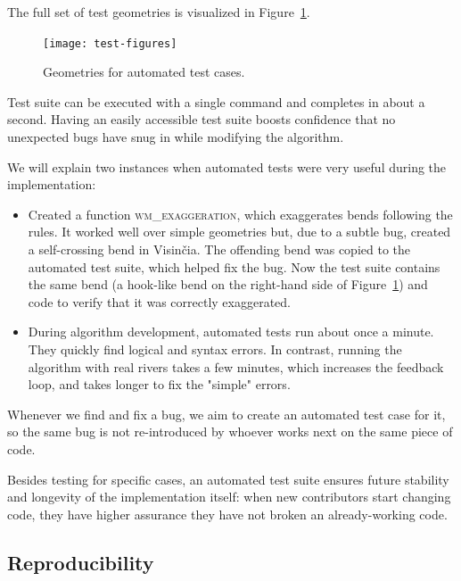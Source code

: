 \documentclass[a4paper]{article}
\begin{document}
The full set of test geometries is visualized in Figure~\ref{fig:test-figures}.

\begin{figure}[ht]
    \centering
    \texttt{[image: test-figures]}
    \caption{Geometries for automated test cases.}
    \label{fig:test-figures}
\end{figure}

Test suite can be executed with a single command and completes in about a
second. Having an easily accessible test suite boosts confidence that no
unexpected bugs have snug in while modifying the algorithm.

We will explain two instances when automated tests were very useful during
the implementation:
\begin{itemize}

    \item Created a function \textsc{wm\_exaggeration}, which exaggerates bends
        following the rules. It worked well over simple geometries but, due to
        a subtle bug, created a self-crossing bend in Visinčia. The offending
        bend was copied to the automated test suite, which helped fix the bug.
        Now the test suite contains the same bend (a hook-like bend on the
        right-hand side of Figure~\ref{fig:test-figures}) and code to verify
        that it was correctly exaggerated.

    \item During algorithm development, automated tests run about once a
        minute. They quickly find logical and syntax errors. In contrast,
        running the algorithm with real rivers takes a few minutes, which
        increases the feedback loop, and takes longer to fix the "simple"
        errors.

\end{itemize}

Whenever we find and fix a bug, we aim to create an automated test case for it,
so the same bug is not re-introduced by whoever works next on the same piece of
code.

Besides testing for specific cases, an automated test suite ensures future
stability and longevity of the implementation itself: when new contributors
start changing code, they have higher assurance they have not broken
an already-working code.

\subsection{Reproducibility}
\label{sec:reproducing-the-paper}
\end{document}
